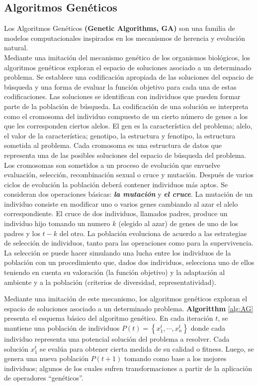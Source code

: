 \documentclass[9pt,a4paper,twoside]{rho-class/rho}
\begin{document}
        \subsection{Algoritmos Genéticos}
            Los Algoritmos Genéticos \textbf{(Genetic Algorithms, GA)} \cite{Michalewicz1999, Back1997, Diaz1996} son una familia de modelos computacionales inspirados en los mecanismos de herencia y evolución natural.\vspace{1mm} \\ 
            Mediante una imitación del mecanismo genético de los organismos biológicos, los algoritmos genéticos exploran el espacio de soluciones asociado a un determinado problema. Se establece una codificación apropiada de las soluciones del espacio de búsqueda y una forma de evaluar la función objetivo para cada una de estas codificaciones. Las soluciones se identifican con individuos que pueden formar parte de la población de búsqueda. La codificación de una solución se interpreta como el cromosoma del individuo compuesto de un cierto número de genes a los que les corresponden ciertos alelos. El gen es la característica del problema; alelo, el valor de la característica; genotipo, la estructura y fenotipo, la estructura sometida al problema. Cada cromosoma es una estructura de datos que representa una de las posibles soluciones del espacio de búsqueda del problema. Los cromosomas son sometidos a un proceso de evolución que envuelve evaluación, selección, recombinación sexual o cruce y mutación. Después de varios ciclos de evolución la población deberá contener individuos más aptos.
            Se consideran dos operaciones básicas: \textbf{\textit{la mutación}} y \textbf{\textit{el cruce}}. La mutación de un individuo consiste en modificar uno o varios genes cambiando al azar el alelo correspondiente. El cruce de dos individuos, llamados padres, produce un individuo hijo tomando un numero $k$ (elegido al azar) de genes de uno de los padres y los $t-k$ del otro. La población evoluciona de acuerdo a las estrategias de selección de individuos, tanto para las operaciones como para la supervivencia. La selección se puede hacer simulando una lucha entre los individuos de la población con un procedimiento que, dados dos individuos, selecciona uno de ellos teniendo en cuenta su valoración (la función objetivo) y la adaptación al ambiente y a la población (criterios de diversidad, representatividad).

            Mediante una imitación de este mecanismo, los algoritmos genéticos exploran el espacio de soluciones asociado a un determinado problema. \textbf{Algoritthm} \ref{alg:AG} presenta el esquema básico del algoritmo genético. En cada iteración $t$, se mantiene una población de individuos $P\left(t\right)=\left\{{x}_{1}^{t},\cdots, {x}_{n}^{t}\right\}$ donde cada individuo representa una potencial solución del problema a resolver. Cada solución ${x}_{1}^{t}$ se evalúa para obtener cierta medida de su calidad o fitness. Luego, se genera una nueva población $P\left(t + 1\right)$ tomando como base a los mejores individuos; algunos de los cuales sufren transformaciones a partir de la aplicación de operadores “genéticos”.
            
\end{document}

